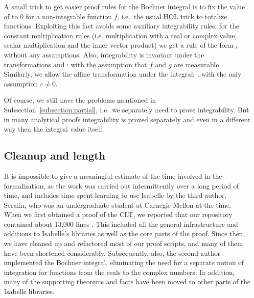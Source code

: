 \documentclass{svjour3}
\newcommand{\todo}[1]{\fxnote{#1}}
\begin{document}
A small trick to get easier proof rules for the Bochner integral is to fix the value of  to $0$ for a non-integrable function $f$, i.e.~the usual HOL trick to totalize functions. Exploiting this fact avoids some auxiliary integrability rules: for the constant multiplication rules (i.e. multiplication with a real or complex value, scalar multiplication and the inner vector product) we get a rule of the form , without any assumptions. Also, integrability is invariant under the transformations  and :  with the assumption that $f$ and $g$ are measurable. Similarly, we allow the affine transformation under the integral: , with the only assumption $c \not= 0$.

Of course, we still have the problems mentioned in Subsection~\ref{subsection:partial}, i.e.~we separately need to prove integrability. But in many analytical proofs integrability is proved separately and even in a different way then the integral value itself.

\subsection{Cleanup and length}

\todo{Need lengths and page numbers.}

It is impossible to give a meaningful estimate of the time involved in the formalization, as the work was carried out intermittently over a long period of time, and includes time spent learning to use Isabelle by the third author, Serafin, who was an undergraduate student at Carnegie Mellon at the time. When we first obtained a proof of the CLT, we reported that our repository contained about 13,000 lines \cite{avigad:hoelzl:serafin:14}. This included all the general infrastructure and additions to Isabelle's libraries as well as the core parts of the proof. Since then, we have cleaned up and refactored most of our proof scripts, and many of them have been shortened considerably. Subsequently, also, the second author implemented the Bochner integral, eliminating the need for a separate notion of integration for functions from the reals to the complex numbers. In addition, many of the supporting theorems and facts have been moved to other parts of the Isabelle libraries. 
\end{document}
